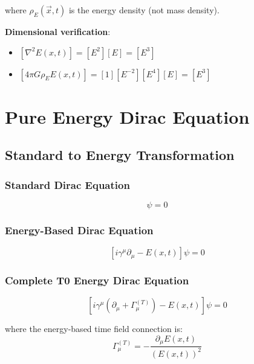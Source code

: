 \documentclass[12pt,a4paper]{article}
\newcommand{\checked}{\checkmark}
\newcommand{\Efield}{E(x,t)}
\newcommand{\vecx}{\vec{x}}
\newcommand{\GammaT}{\Gamma_{\mu}^{(T)}}
\begin{document}
	where $\rho_E(\vecx,t)$ is the energy density (not mass density).
	
	\textbf{Dimensional verification}:
	\begin{itemize}
		\item $[\nabla^2 \Efield] = [E^2][E] = [E^3]$
		\item $[4\pi G \rho_E \Efield] = [1][E^{-2}][E^4][E] = [E^3]$ \checked
	\end{itemize}
	
	\section{Pure Energy Dirac Equation}
	\label{sec:energy_dirac}
	
	\subsection{Standard to Energy Transformation}
	\label{subsec:standard_to_energy}
	
	\subsubsection{Standard Dirac Equation}
	\begin{equation}
		[i\gamma^{\mu}\partial_{\mu} - m]\psi = 0
		\label{eq:standard_dirac}
	\end{equation}
	
	\subsubsection{Energy-Based Dirac Equation}
	\begin{equation}
		\boxed{[i\gamma^{\mu}\partial_{\mu} - \Efield]\psi = 0}
		\label{eq:energy_dirac_simple}
	\end{equation}
	
	\subsubsection{Complete T0 Energy Dirac Equation}
	\begin{equation}
		\boxed{[i\gamma^{\mu}(\partial_{\mu} + \GammaT) - \Efield]\psi = 0}
		\label{eq:complete_energy_dirac}
	\end{equation}
	
	where the energy-based time field connection is:
	\begin{equation}
		\GammaT = -\frac{\partial_{\mu} \Efield}{(\Efield)^2}
		\label{eq:energy_connection}
	\end{equation}
	
\end{document}
